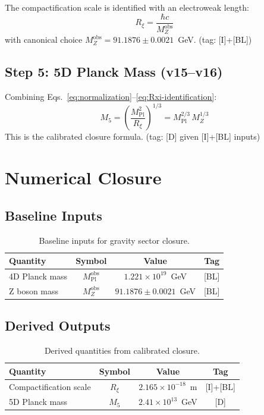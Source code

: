 \documentclass[11pt,a4paper]{article}
\newcommand{\Rxi}{R_\xi}
\newcommand{\Mpl}{M_{\mathrm{Pl}}}
\newcommand{\Mfive}{M_5}
\newcommand{\MZ}{M_Z}
\begin{document}
The compactification scale is identified with an electroweak length:
\begin{equation}
\boxed{\Rxi = \frac{\hbar c}{\MZ^{\mathrm{obs}}}}
\label{eq:Rxi-identification}
\end{equation}
with canonical choice $\MZ^{\mathrm{obs}} = 91.1876 \pm 0.0021$~GeV.
\hfill (tag: [I]+[BL])

\subsection{Step 5: 5D Planck Mass (v15--v16)}

Combining Eqs.~\eqref{eq:normalization}--\eqref{eq:Rxi-identification}:
\begin{equation}
\boxed{\Mfive = \left(\frac{\Mpl^2}{\Rxi}\right)^{1/3} = \Mpl^{2/3} \, \MZ^{1/3}}
\label{eq:M5-closure}
\end{equation}
This is the calibrated closure formula. \hfill (tag: [D] given [I]+[BL] inputs)

\section{Numerical Closure}

\subsection{Baseline Inputs}

\begin{table}[h]
\centering
\caption{Baseline inputs for gravity sector closure.}
\label{tab:inputs}
\begin{tabular}{@{}lccc@{}}
\toprule
Quantity & Symbol & Value & Tag \\
\midrule
4D Planck mass & $\Mpl^{\mathrm{obs}}$ & $1.221 \times 10^{19}$~GeV & [BL] \\
Z boson mass & $\MZ^{\mathrm{obs}}$ & $91.1876 \pm 0.0021$~GeV & [BL] \\
\bottomrule
\end{tabular}
\end{table}

\subsection{Derived Outputs}

\begin{table}[h]
\centering
\caption{Derived quantities from calibrated closure.}
\label{tab:outputs}
\begin{tabular}{@{}lccc@{}}
\toprule
Quantity & Symbol & Value & Tag \\
\midrule
Compactification scale & $\Rxi$ & $2.165 \times 10^{-18}$~m & [I]+[BL] \\
5D Planck mass & $\Mfive$ & $2.41 \times 10^{13}$~GeV & [D] \\
\bottomrule
\end{tabular}
\end{table}
\end{document}
